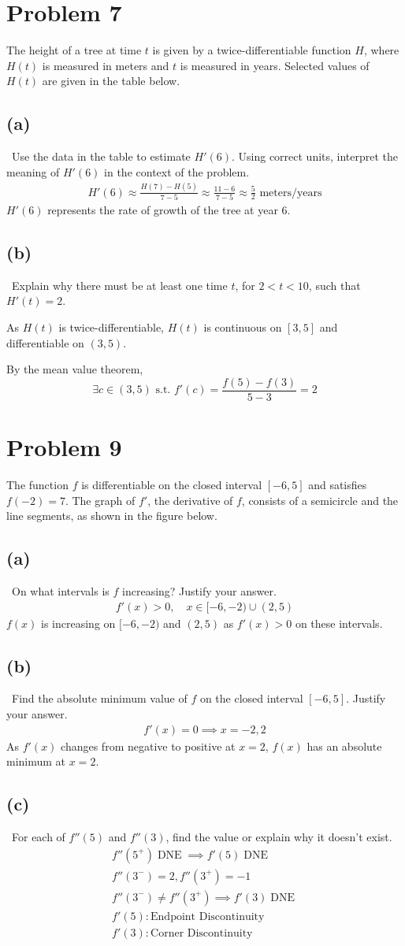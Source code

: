 \documentclass[12pt]{article}
\newcommand{\vem}{\vspace{0.5em}}
\newcommand{\problem}[1]{\section{Problem #1}}
\newcommand{\subproblem}[1]{\subsection{(#1)} \,}
\DeclareMathOperator{\dne}{DNE}
\begin{document}
\problem{7}
The height of a tree at time $t$ is given by a twice-differentiable function $H$, where $H(t)$ is measured in meters and $t$ is measured in years. Selected values of $H(t)$ are given in the table below. \vem

\subproblem{a}
Use the data in the table to estimate $H'(6)$. Using correct units, interpret the meaning of $H'(6)$ in the context of the problem.
\begin{gather*}
    H'(6)\approx \frac{H(7)-H(5)}{7-5}\approx \frac{11-6}{7-5}\approx\boxed{\frac{5}{2} \text{ meters/years}}
\end{gather*}
$H'(6)$ represents the rate of growth of the tree at year 6. \vem

\subproblem{b}
Explain why there must be at least one time $t$, for $2<t<10$, such that $H'(t)=2$. \vem

As $H(t)$ is twice-differentiable, $H(t)$ is continuous on $[3,5]$ and differentiable on $(3,5)$. \vem

By the mean value theorem,
\[
\boxed{\exists c\in (3,5) \text{ s.t. } f'(c)=\frac{f(5)-f(3)}{5-3}=2}
\]

\problem{9}
The function $f$ is differentiable on the closed interval $[-6,5]$ and satisfies $f(-2)=7$. The graph of $f'$, the derivative of $f$, consists of a semicircle and the line segments, as shown in the figure below. \vem

\subproblem{a}
On what intervals is $f$ increasing? Justify your answer.
\begin{gather*}
    f'(x)>0,\quad x\in [-6,-2) \cup (2,5)
\end{gather*}
$f(x)$ is increasing on $[-6,-2)$ and $(2,5)$ as $f'(x)>0$ on these intervals. \vem

\subproblem{b}
Find the absolute minimum value of $f$ on the closed interval $[-6,5]$. Justify your answer.
\begin{gather*}
    f'(x)=0 \implies x=-2,2
\end{gather*}
As $f'(x)$ changes from negative to positive at $x=2$, $f(x)$ has an absolute minimum at $x=2$. \vem

\subproblem{c}
For each of $f''(5)$ and $f''(3)$, find the value or explain why it doesn't exist. 
\begin{gather*}
    f''(5^+) \dne \implies \boxed{f'(5) \dne} \\
    f''(3^-)=2, f''(3^+)=-1\\
    f''(3^-) \ne f''(3^+) \implies \boxed{f'(3) \dne}\\
    f'(5): \text{Endpoint Discontinuity}\\
    f'(3): \text{Corner Discontinuity}
\end{gather*}
\end{document}
